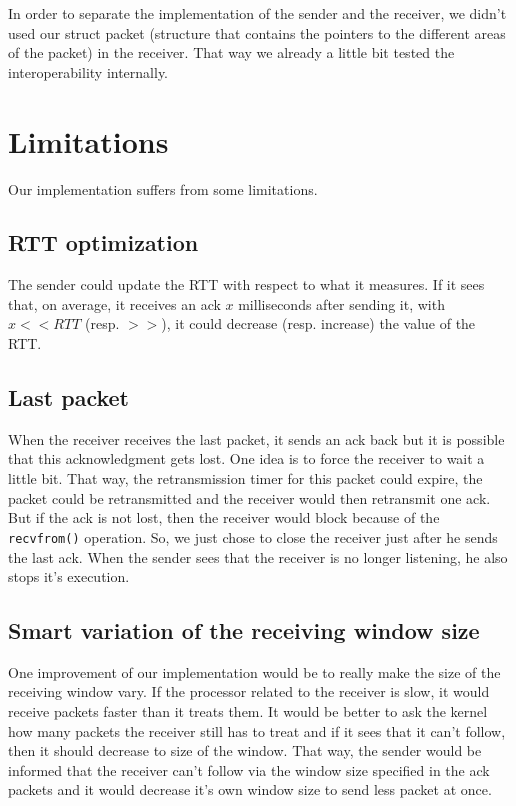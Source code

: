 \documentclass[10pt,a4paper]{article}
\begin{document}
In order to separate the implementation of the sender and the receiver, we didn't used our struct packet (structure that contains the pointers to the different areas of the packet) in the receiver. That way we already a little bit tested the interoperability internally.

\section{Limitations}

Our implementation suffers from some limitations.

\subsection{RTT optimization} The sender could update the RTT with respect to what it measures. If it sees that, on average, it receives an ack $x$ milliseconds after sending it, with $x << RTT$ (resp. $>>$), it could decrease (resp. increase) the value of the RTT.

\subsection{Last packet}
When the receiver receives the last packet, it sends an ack back but it is possible that this acknowledgment gets lost. One idea is to force the receiver to wait a little bit. That way, the retransmission timer for this packet could expire, the packet could be retransmitted and the receiver would then retransmit one ack. But if the ack is not lost, then the receiver would block because of the \texttt{recvfrom()} operation. So, we just chose to close the receiver just after he sends the last ack. When the sender sees that the receiver is no longer listening, he also stops it's execution.

\subsection{Smart variation of the receiving window size}
One improvement of our implementation would be to really make the size of the receiving window vary. If the processor related to the receiver is slow, it would receive packets faster than it treats them. It would be better to ask the kernel how many packets the receiver still has to treat and if it sees that it can't follow, then it should decrease to size of the window. That way, the sender would be informed that the receiver can't follow via the window size specified in the ack packets and it would decrease it's own window size to send less packet at once.
\end{document}

